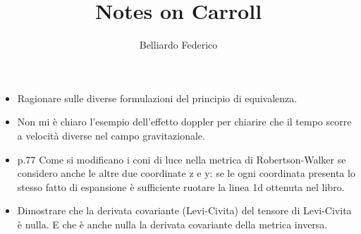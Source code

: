 \documentclass[10pt,a4paper]{article}
\author{Belliardo Federico}
\title{Notes on Carroll}
\begin{document}
\maketitle
\begin{itemize}
\item Ragionare sulle diverse formulazioni del principio di equivalenza.
\item Non mi è chiaro l'esempio dell'effetto doppler per chiarire che il tempo scorre a velocità diverse nel campo gravitazionale.

\item p.77 Come si modificano i coni di luce nella metrica di Robertson-Walker se considero anche le altre due coordinate z e y: se le ogni coordinata presenta lo stesso fatto di espansione è sufficiente ruotare la linea 1d ottenuta nel libro.

\item Dimostrare che la derivata covariante (Levi-Civita) del tensore di Levi-Civita è nulla. E che è anche nulla la derivata covariante della metrica inversa.


\end{itemize}
\end{document}
